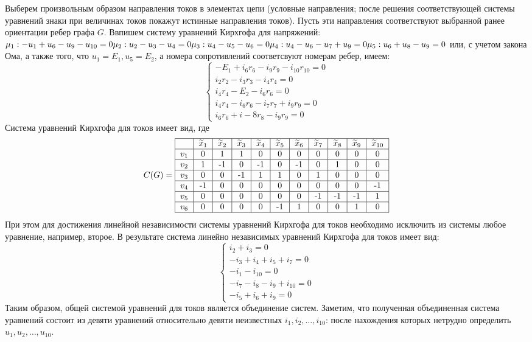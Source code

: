 \documentclass[12pt, letterpaper, titlepage]{article}
\begin{document}
Выберем произвольным образом направления токов в элементах цепи (условные
направления; после решения соответствующей системы уравнений знаки при величинах
токов покажут истинные направления токов). Пусть эти направления соответствуют
выбранной ранее ориентации ребер графа $G$. Ввпишем систему уравнений Кирхгофа для напряжений:\\
$
\mu_1: -u_1+u_6-u_9-u_{10}=0\\
\mu_2: u_2-u_3-u_4=0\\
\mu_3: u_4-u_5-u_6=0\\
\mu_4: u_4-u_6-u_7+u_9=0\\
\mu_5: u_6+u_8-u_9=0\\
$
или, с учетом закона Ома, а также того, что $u_1=E_1, u_5=E_2$, а номера сопротивлений соответсвуют номерам ребер, имеем:
\[
    \begin{cases}
    -E_1+i_6r_6-i_9r_9-i_{10}r_{10}=0\\
    i_2r_2-i_3r_3-i_4r_4=0\\
    i_4r_4-E_2-i_6r_6=0\\
    i_4r_4-i_6r_6-i_7r_7+i_9r_9=0\\
    i_6r_6+i-8r_8-i_9r_9=0
    \end{cases}
\]
Система уравнений Кирхгофа для токов имеет вид, где
\[
C(G)=
\begin{tabular}{|c|c|c|c|c|c|c|c|c|c|c|}
    \hline
    & $\widetilde x_1$ & $\widetilde x_2$ & $\widetilde x_3$ & $\widetilde x_4$ & $\widetilde x_5$ & $\widetilde x_6$ & $\widetilde x_7$ & $\widetilde x_8$ & $\widetilde x_9$ & $\widetilde x_{10}$\\
    \hline
    $v_1$ & 0 & 1 & 1 & 0 & 0 & 0 & 0 & 0 & 0 & 0 \\
    \hline
    $v_2$ & 1 & -1 & 0 & -1 & 0 & -1 & 0 & 1& 0& 0\\
    \hline
    $v_3$ & 0 & 0 & -1 & 1 & 1 & 0 & 1& 0& 0& 0 \\
    \hline
    $v_4$ & -1 & 0 & 0 & 0 & 0 & 0 & 0 & 0 & 0 & -1 \\
    \hline
    $v_5$ & 0 & 0 & 0 & 0 & 0 & 0 & -1 & -1 & -1 & 1 \\
    \hline
    $v_6$ & 0 & 0 & 0 & 0 & -1 & 1 & 0 &0& 1& 0 \\
    \hline
\end{tabular}
\]
При этом для достижения линейной независимости системы уравнений Кирхгофа
для токов необходимо исключить из системы любое уравнение, например, второе. В
результате система линейно независимых уравнений Кирхгофа для токов имеет вид:
\[
    \begin{cases}
        i_2+i_3=0\\
        -i_3+i_4+i_5+i_7=0\\
        -i_1-i_{10}=0\\
        -i_7-i_8-i_9+i_{10}=0\\
        -i_5+i_6+i_9=0
    \end{cases}
\]
Таким образом, общей системой уравнений для токов является объединение систем. Заметим, что полученная объединенная система уравнений состоит из девяти
уравнений относительно девяти неизвестных $i_1,i_2,\dots,i_{10}$: после нахождения которых
нетрудно определить $u_1,u_2,\dots,u_{10}$.
\end{document}
